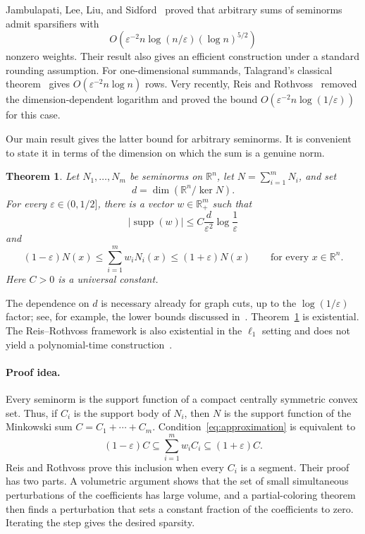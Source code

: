 \documentclass[11pt]{article}
\newtheorem{theorem}{Theorem}[section]
\theoremstyle{remark}
\newcommand{\R}{\mathbb{R}}
\newcommand{\supp}{\operatorname{supp}}
\newcommand{\eps}{\varepsilon}
\begin{document}
Jambulapati, Lee, Liu, and Sidford~\cite{JLLS23} proved that arbitrary
sums of seminorms admit sparsifiers with
\[
  O\!\left(\eps^{-2}n\log(n/\eps)(\log n)^{5/2}\right)
\]
nonzero weights.  Their result also gives an efficient construction
under a standard rounding assumption.  For one-dimensional summands,
Talagrand's classical theorem~\cite{Talagrand90} gives
$O(\eps^{-2}n\log n)$ rows.  Very recently, Reis and
Rothvoss~\cite{RR26} removed the dimension-dependent logarithm and
proved the bound $O(\eps^{-2}n\log(1/\eps))$ for this case.

Our main result gives the latter bound for arbitrary seminorms.  It is
convenient to state it in terms of the dimension on which the sum is a
genuine norm.

\begin{theorem}\label{thm:main}
Let $N_1,\ldots,N_m$ be seminorms on $\R^n$, let
$N=\sum_{i=1}^mN_i$, and set
\[
  d=\dim(\R^n/\ker N).
\]
For every $\eps\in(0,1/2]$, there is a vector $w\in\R_+^m$ such that
\[
  |\supp(w)|\leq
  C\frac{d}{\eps^2}\log\frac1\eps
\]
and
\[
  (1-\eps)N(x)\leq\sum_{i=1}^m w_iN_i(x)
  \leq(1+\eps)N(x)
  \qquad\text{for every }x\in\R^n.
\]
Here $C>0$ is a universal constant.
\end{theorem}

The dependence on $d$ is necessary already for graph cuts, up to the
$\log(1/\eps)$ factor; see, for example, the lower bounds discussed
in~\cite{AKW14}.  Theorem~\ref{thm:main} is existential.  The
Reis--Rothvoss framework is also existential in the $\ell_1$ setting
and does not yield a polynomial-time construction~\cite{RR26}.

\paragraph{Proof idea.}
Every seminorm is the support function of a compact centrally
symmetric convex set.  Thus, if $C_i$ is the support body of $N_i$,
then $N$ is the support function of the Minkowski sum
$C=C_1+\cdots+C_m$.  Condition~\eqref{eq:approximation} is equivalent
to
\[
  (1-\eps)C\subseteq \sum_{i=1}^m w_iC_i
  \subseteq(1+\eps)C.
\]
Reis and Rothvoss prove this inclusion when every $C_i$ is a segment.
Their proof has two parts.  A volumetric argument shows that the set of
small simultaneous perturbations of the coefficients has large
volume, and a partial-coloring theorem then finds a perturbation that
sets a constant fraction of the coefficients to zero.  Iterating the
step gives the desired sparsity.
\end{document}
